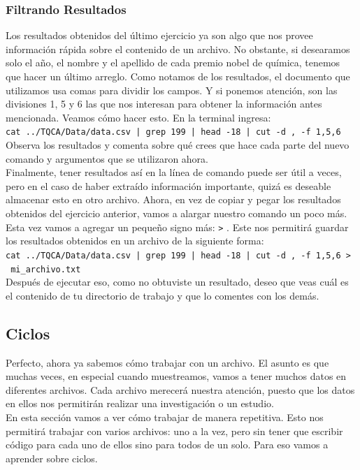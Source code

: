 \documentclass[10pt,letterpaper]{article}
\newcommand{\inlinecode}[1]{
\colorbox{light-gray}{\texttt{#1}}
}
\begin{document}
\subsubsection{Filtrando Resultados}
Los resultados obtenidos del \'ultimo ejercicio ya son algo que nos provee informaci\'on r\'apida sobre el contenido de un archivo. No obstante, si desearamos solo el a\~no, el nombre y el apellido de cada premio nobel de qu\'imica, tenemos que hacer un \'ultimo arreglo. Como notamos de los resultados, el documento que utilizamos usa comas para dividir los campos. Y si ponemos atenci\'on, son las divisiones 1, 5 y 6 las que nos interesan para obtener la informaci\'on antes mencionada. Veamos c\'omo hacer esto. En la terminal ingresa:\\
\inlinecode{cat ../TQCA/Data/data.csv | grep 199 | head -18 | cut -d , -f 1,5,6}\\
Observa los resultados y comenta sobre qu\'e crees que hace cada parte del nuevo comando y argumentos que se utilizaron ahora.\\

Finalmente, tener resultados as\'i en la l\'inea de comando puede ser \'util a veces, pero en el caso de haber extra\'ido informaci\'on importante, quiz\'a es deseable almacenar esto en otro archivo. Ahora, en vez de copiar y pegar los resultados obtenidos del ejercicio anterior, vamos a alargar nuestro comando un poco m\'as. Esta vez vamos a agregar un peque\~no signo m\'as: \inlinecode{>}. Este nos permitir\'a guardar los resultados obtenidos en un archivo de la siguiente forma:\\
\inlinecode{cat ../TQCA/Data/data.csv | grep 199 | head -18 | cut -d , -f 1,5,6 > \ mi\_archivo.txt}\\
Despu\'es de ejecutar eso, como no obtuviste un resultado, deseo que veas cu\'al es el contenido de tu directorio de trabajo y que lo comentes con los dem\'as.

\subsection{Ciclos}
Perfecto, ahora ya sabemos c\'omo trabajar con un archivo. El asunto es que muchas veces, en especial cuando muestreamos, vamos a tener muchos datos en diferentes archivos. Cada archivo merecer\'a nuestra atenci\'on, puesto que los datos en ellos nos permitir\'an realizar una investigaci\'on o un estudio.\\

En esta secci\'on vamos a ver c\'omo trabajar de manera repetitiva. Esto nos permitir\'a trabajar con varios archivos: uno a la vez, pero sin tener que escribir c\'odigo para cada uno de ellos sino para todos de un solo. Para eso vamos a aprender sobre ciclos.
\end{document}
